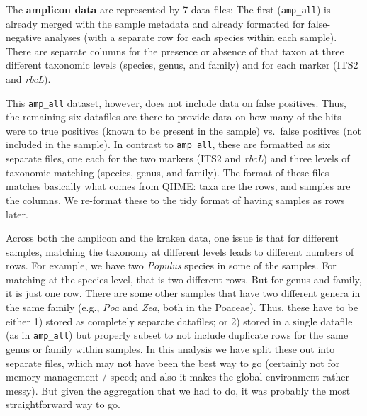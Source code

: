 \documentclass[
]{article}
\begin{document}
The \textbf{amplicon data} are represented by 7 data files: The first
(\texttt{amp\_all}) is already merged with the sample metadata and
already formatted for false-negative analyses (with a separate row for
each species within each sample). There are separate columns for the
presence or absence of that taxon at three different taxonomic levels
(species, genus, and family) and for each marker (ITS2 and \emph{rbcL}).

This \texttt{amp\_all} dataset, however, does not include data on false
positives. Thus, the remaining six datafiles are there to provide data
on how many of the hits were to true positives (known to be present in
the sample) vs.~false positives (not included in the sample). In
contrast to \texttt{amp\_all}, these are formatted as six separate
files, one each for the two markers (ITS2 and \emph{rbcL}) and three
levels of taxonomic matching (species, genus, and family). The format of
these files matches basically what comes from QIIME: taxa are the rows,
and samples are the columns. We re-format these to the tidy format of
having samples as rows later.

Across both the amplicon and the kraken data, one issue is that for
different samples, matching the taxonomy at different levels leads to
different numbers of rows. For example, we have two \emph{Populus}
species in some of the samples. For matching at the species level, that
is two different rows. But for genus and family, it is just one row.
There are some other samples that have two different genera in the same
family (e.g., \emph{Poa} and \emph{Zea}, both in the Poaceae). Thus,
these have to be either 1) stored as completely separate datafiles; or
2) stored in a single datafile (as in \texttt{amp\_all}) but properly
subset to not include duplicate rows for the same genus or family within
samples. In this analysis we have split these out into separate files,
which may not have been the best way to go (certainly not for memory
management / speed; and also it makes the global environment rather
messy). But given the aggregation that we had to do, it was probably the
most straightforward way to go.
\end{document}
